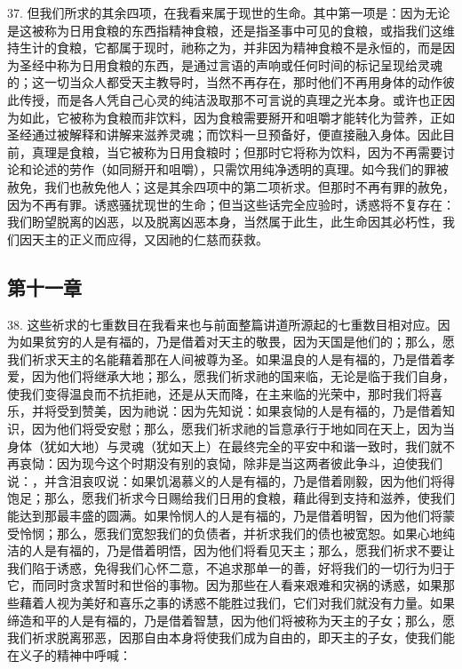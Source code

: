 37. 但我们所求的其余四项，在我看来属于现世的生命。其中第一项是：因为无论是这被称为日用食粮的东西指精神食粮，还是指圣事中可见的食粮，或指我们这维持生计的食粮，它都属于现时，祂称之为，并非因为精神食粮不是永恒的，而是因为圣经中称为日用食粮的东西，是通过言语的声响或任何时间的标记呈现给灵魂的；这一切当众人都受天主教导时，当然不再存在，那时他们不再用身体的动作彼此传授，而是各人凭自己心灵的纯洁汲取那不可言说的真理之光本身。或许也正因为如此，它被称为食粮而非饮料，因为食粮需要掰开和咀嚼才能转化为营养，正如圣经通过被解释和讲解来滋养灵魂；而饮料一旦预备好，便直接融入身体。因此目前，真理是食粮，当它被称为日用食粮时；但那时它将称为饮料，因为不再需要讨论和论述的劳作（如同掰开和咀嚼），只需饮用纯净透明的真理。如今我们的罪被赦免，我们也赦免他人；这是其余四项中的第二项祈求。但那时不再有罪的赦免，因为不再有罪。诱惑骚扰现世的生命；但当这些话完全应验时，诱惑将不复存在：我们盼望脱离的凶恶，以及脱离凶恶本身，当然属于此生，此生命因其必朽性，我们因天主的正义而应得，又因祂的仁慈而获救。\par


\subsection{第十一章}

38. 这些祈求的七重数目在我看来也与前面整篇讲道所源起的七重数目相对应。因为如果贫穷的人是有福的，乃是借着对天主的敬畏，因为天国是他们的；那么，愿我们祈求天主的名能藉着那在人间被尊为圣。如果温良的人是有福的，乃是借着孝爱，因为他们将继承大地；那么，愿我们祈求祂的国来临，无论是临于我们自身，使我们变得温良而不抗拒祂，还是从天而降，在主来临的光荣中，那时我们将喜乐，并将受到赞美，因为祂说：因为先知说：如果哀恸的人是有福的，乃是借着知识，因为他们将受安慰；那么，愿我们祈求祂的旨意承行于地如同在天上，因为当身体（犹如大地）与灵魂（犹如天上）在最终完全的平安中和谐一致时，我们就不再哀恸：因为现今这个时期没有别的哀恸，除非是当这两者彼此争斗，迫使我们说：，并含泪哀叹说：如果饥渴慕义的人是有福的，乃是借着刚毅，因为他们将得饱足；那么，愿我们祈求今日赐给我们日用的食粮，藉此得到支持和滋养，使我们能达到那最丰盛的圆满。如果怜悯人的人是有福的，乃是借着明智，因为他们将蒙受怜悯；那么，愿我们宽恕我们的负债者，并祈求我们的债也被宽恕。如果心地纯洁的人是有福的，乃是借着明悟，因为他们将看见天主；那么，愿我们祈求不要让我们陷于诱惑，免得我们心怀二意，不追求那单一的善，好将我们的一切行为归于它，而同时贪求暂时和世俗的事物。因为那些在人看来艰难和灾祸的诱惑，如果那些藉着人视为美好和喜乐之事的诱惑不能胜过我们，它们对我们就没有力量。如果缔造和平的人是有福的，乃是借着智慧，因为他们将被称为天主的子女；那么，愿我们祈求脱离邪恶，因那自由本身将使我们成为自由的，即天主的子女，使我们能在义子的精神中呼喊：\par

